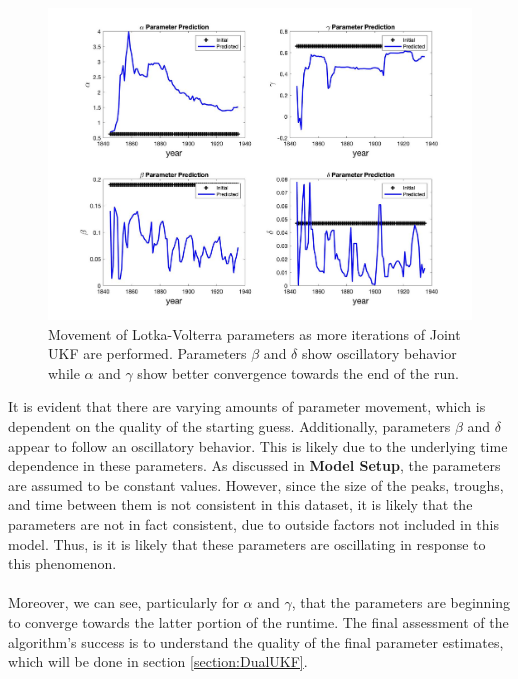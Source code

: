 \begin{figure}[H]
    \centering
    \includegraphics[width=15cm]{Kalman_Filter_Images/LV_Joint_ParamsOverTime.jpg}
    \caption{Movement of Lotka-Volterra parameters as more iterations of Joint UKF are performed. Parameters $\beta$ and $\delta$ show oscillatory behavior while $\alpha$ and $\gamma$ show better convergence towards the end of the run.}
    \label{fig:LV_Joint_ParamMovement}
\end{figure}


It is evident that there are varying amounts of parameter movement, which is dependent on the quality of the starting guess. Additionally, parameters $\beta$ and $\delta$ appear to follow an oscillatory behavior. This is likely due to the underlying time dependence in these parameters. As discussed in \textbf{Model Setup}, the parameters are assumed to be constant values. However, since the size of the peaks, troughs, and time between them is not consistent in this dataset, it is likely that the parameters are not in fact consistent, due to outside factors not included in this model. Thus, is it is likely that these parameters are oscillating in response to this phenomenon.\\
\\

Moreover, we can see, particularly for $\alpha$ and $\gamma$, that the parameters are beginning to converge towards the latter portion of the runtime. The final assessment of the algorithm's success is to understand the quality of the final parameter estimates, which will be done in section \ref{section:DualUKF}.


